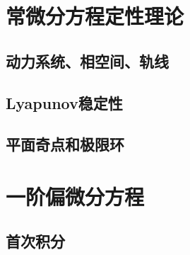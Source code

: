 \documentclass[lang=cn,10pt]{elegantbook}
\begin{document}
\chapter{常微分方程定性理论}
\section{动力系统、相空间、轨线}
\section{Lyapunov稳定性}
\section{平面奇点和极限环}
\newpage

\chapter{一阶偏微分方程}
\section{首次积分}
\end{document}

